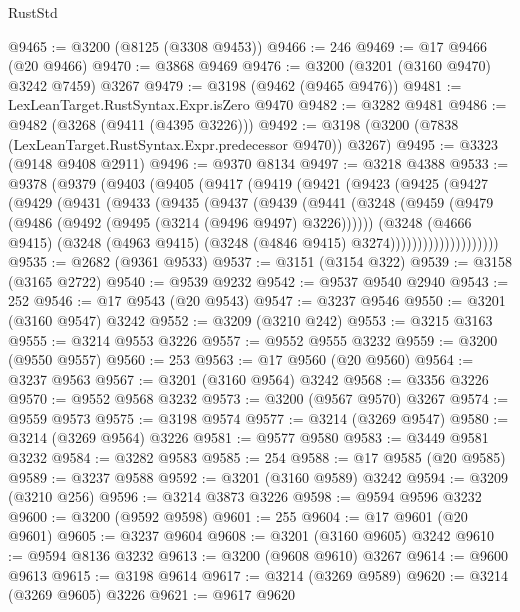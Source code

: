 \begin{lexlean}{RustStd}
\begin{coremodule}
{\begin{coremodule}
{{{{{{{{{{{{{{{{{{{{{{{{{@9465 := @3200 (@8125 (@3308 @9453))
@9466 := 246
@9469 := @17 @9466 (@20 @9466)
@9470 := @3868 @9469
@9476 := @3200 (@3201 (@3160 @9470) @3242 @7459) @3267
@9479 := @3198 (@9462 (@9465 @9476))
@9481 := LexLeanTarget.RustSyntax.Expr.isZero @9470
@9482 := @3282 @9481
@9486 := @9482 (@3268 (@9411 (@4395 @3226)))
@9492 := @3198 (@3200 (@7838 (LexLeanTarget.RustSyntax.Expr.predecessor @9470)) @3267)
@9495 := @3323 (@9148 @9408 @2911)
@9496 := @9370 @8134
@9497 := @3218 @4388
@9533 := @9378
    (@9379
      (@9403
        (@9405
          (@9417
            (@9419
              (@9421
                (@9423
                  (@9425
                    (@9427
                      (@9429
                        (@9431
                          (@9433
                            (@9435
                              (@9437
                                (@9439
                                  (@9441
                                    (@3248
                                      (@9459
                                        (@9479 (@9486 (@9492 (@9495 (@3214 (@9496 @9497) @3226))))))
                                      (@3248
                                        (@4666 @9415)
                                        (@3248
                                          (@4963 @9415)
                                          (@3248 (@4846 @9415) @3274))))))))))))))))))))
@9535 := @2682 (@9361 @9533)
@9537 := @3151 (@3154 @322)
@9539 := @3158 (@3165 @2722)
@9540 := @9539 @9232
@9542 := @9537 @9540 @2940
@9543 := 252
@9546 := @17 @9543 (@20 @9543)
@9547 := @3237 @9546
@9550 := @3201 (@3160 @9547) @3242
@9552 := @3209 (@3210 @242)
@9553 := @3215 @3163
@9555 := @3214 @9553 @3226
@9557 := @9552 @9555 @3232
@9559 := @3200 (@9550 @9557)
@9560 := 253
@9563 := @17 @9560 (@20 @9560)
@9564 := @3237 @9563
@9567 := @3201 (@3160 @9564) @3242
@9568 := @3356 @3226
@9570 := @9552 @9568 @3232
@9573 := @3200 (@9567 @9570) @3267
@9574 := @9559 @9573
@9575 := @3198 @9574
@9577 := @3214 (@3269 @9547)
@9580 := @3214 (@3269 @9564) @3226
@9581 := @9577 @9580
@9583 := @3449 @9581 @3232
@9584 := @3282 @9583
@9585 := 254
@9588 := @17 @9585 (@20 @9585)
@9589 := @3237 @9588
@9592 := @3201 (@3160 @9589) @3242
@9594 := @3209 (@3210 @256)
@9596 := @3214 @3873 @3226
@9598 := @9594 @9596 @3232
@9600 := @3200 (@9592 @9598)
@9601 := 255
@9604 := @17 @9601 (@20 @9601)
@9605 := @3237 @9604
@9608 := @3201 (@3160 @9605) @3242
@9610 := @9594 @8136 @3232
@9613 := @3200 (@9608 @9610) @3267
@9614 := @9600 @9613
@9615 := @3198 @9614
@9617 := @3214 (@3269 @9589)
@9620 := @3214 (@3269 @9605) @3226
@9621 := @9617 @9620
}}}}}}}}}}}}}}}}}}}}}}}}}
\end{coremodule}}
\end{coremodule}
\end{lexlean}
